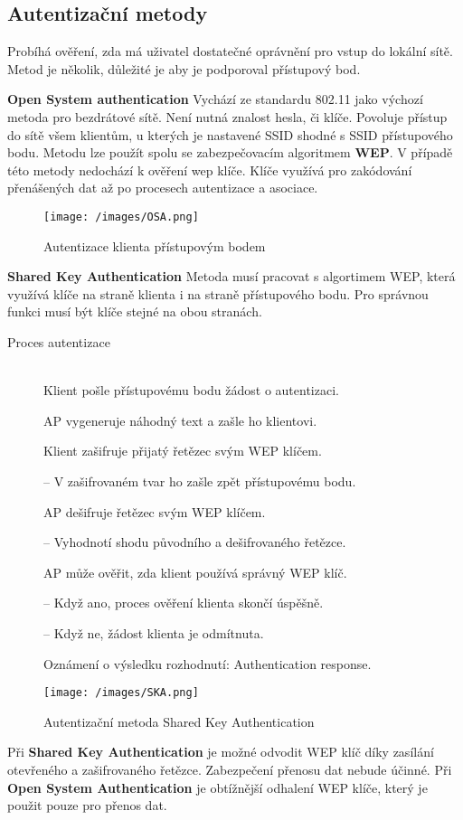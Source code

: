 \subsection{Autentizační metody}
Probíhá ověření, zda má uživatel dostatečné oprávnění pro vstup do lokální sítě. Metod je několik, důležité je aby je podporoval přístupový bod.\par
\textbf{Open System authentication} Vychází ze standardu 802.11 jako výchozí metoda pro bezdrátové sítě. Není nutná znalost hesla, či klíče. Povoluje přístup do sítě všem klientům, u kterých je nastavené SSID shodné s SSID přístupového bodu. Metodu lze použít spolu se zabezpečovacím algoritmem \textbf{WEP}. V případě této metody nedochází k ověření wep klíče. Klíče využívá pro zakódování přenášených dat až po procesech autentizace a asociace.\par

\begin{figure}[ht]
\centering
  \begin{center}
    \texttt{[image: /images/OSA.png]}
  \end{center}
  \caption[Autentizace klienta přístupovým bodem]{Autentizace klienta přístupovým bodem}
\end{figure}
\textbf{Shared Key Authentication} Metoda musí pracovat s algortimem WEP, která využívá klíče na straně klienta i na straně přístupového bodu. Pro správnou funkci musí být klíče stejné na obou stranách.
\begin{description}
    \item [Proces autentizace] \hfill \\
    Klient pošle přístupovému bodu žádost o autentizaci. \par
    AP vygeneruje náhodný text a zašle ho klientovi. \par
    Klient zašifruje přijatý řetězec svým WEP klíčem. \par
    -- V zašifrovaném tvar ho zašle zpět přístupovému bodu. \par
    AP dešifruje řetězec svým WEP klíčem. \par
    -- Vyhodnotí shodu původního a dešifrovaného řetězce. \par
    AP může ověřit, zda klient používá správný WEP klíč. \par
    -- Když ano, proces ověření klienta skončí úspěšně. \par
    -- Když ne, žádost klienta je odmítnuta. \par
    Oznámení o výsledku rozhodnutí: Authentication response. \par
\end{description}
\begin{figure}[ht]
\centering
  \begin{center}
    \texttt{[image: /images/SKA.png]}
  \end{center}
  \caption[Autentizační metoda Shared Key Authentication]{Autentizační metoda Shared Key Authentication}
\end{figure}
Při \textbf{Shared Key Authentication} je možné odvodit WEP klíč díky zasílání otevřeného a zašifrovaného řetězce. Zabezpečení přenosu dat nebude účinné. Při \textbf{Open System Authentication} je obtížnější odhalení WEP klíče, který je použit pouze pro přenos dat.
